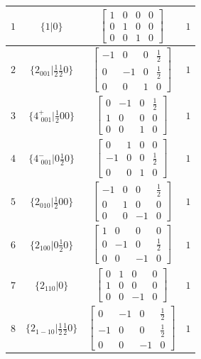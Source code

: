 \documentclass[fleqn,8pt]{jsarticle}
\begin{document}
\begin{longtable}{cccc}
$ 1 $ & $ \{1|0\} $ & $ \begin{bmatrix} 1 & 0 & 0 & 0 \\ 0 & 1 & 0 & 0 \\ 0 & 0 & 1 & 0 \end{bmatrix} $ & $ 1 $ \\ \hline
$ 2 $ & $ \{2{}_{001}|\frac{1}{2} \frac{1}{2} 0\} $ & $ \begin{bmatrix} -1 & 0 & 0 & \frac{1}{2} \\ 0 & -1 & 0 & \frac{1}{2} \\ 0 & 0 & 1 & 0 \end{bmatrix} $ & $ 1 $ \\ \hline
$ 3 $ & $ \{4^{+}_{\,\,001}|\frac{1}{2} 0 0\} $ & $ \begin{bmatrix} 0 & -1 & 0 & \frac{1}{2} \\ 1 & 0 & 0 & 0 \\ 0 & 0 & 1 & 0 \end{bmatrix} $ & $ 1 $ \\ \hline
$ 4 $ & $ \{4^{-}_{\,\,001}|0 \frac{1}{2} 0\} $ & $ \begin{bmatrix} 0 & 1 & 0 & 0 \\ -1 & 0 & 0 & \frac{1}{2} \\ 0 & 0 & 1 & 0 \end{bmatrix} $ & $ 1 $ \\ \hline
$ 5 $ & $ \{2{}_{010}|\frac{1}{2} 0 0\} $ & $ \begin{bmatrix} -1 & 0 & 0 & \frac{1}{2} \\ 0 & 1 & 0 & 0 \\ 0 & 0 & -1 & 0 \end{bmatrix} $ & $ 1 $ \\ \hline
$ 6 $ & $ \{2{}_{100}|0 \frac{1}{2} 0\} $ & $ \begin{bmatrix} 1 & 0 & 0 & 0 \\ 0 & -1 & 0 & \frac{1}{2} \\ 0 & 0 & -1 & 0 \end{bmatrix} $ & $ 1 $ \\ \hline
$ 7 $ & $ \{2{}_{110}|0\} $ & $ \begin{bmatrix} 0 & 1 & 0 & 0 \\ 1 & 0 & 0 & 0 \\ 0 & 0 & -1 & 0 \end{bmatrix} $ & $ 1 $ \\ \hline
$ 8 $ & $ \{2{}_{1-10}|\frac{1}{2} \frac{1}{2} 0\} $ & $ \begin{bmatrix} 0 & -1 & 0 & \frac{1}{2} \\ -1 & 0 & 0 & \frac{1}{2} \\ 0 & 0 & -1 & 0 \end{bmatrix} $ & $ 1 $ \\ \hline

\end{longtable}
\end{document}

